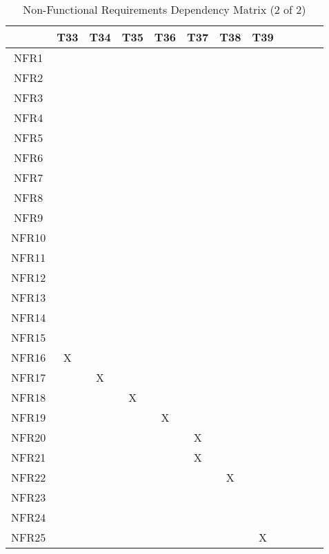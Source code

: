\documentclass[12pt, titlepage]{article}
\begin{document}
\pagebreak
\begin{table}[H]
  \centering
  \caption{Non-Functional Requirements Dependency Matrix (2 of 2)}
  \begin{tabular}{|c|c|c|c|c|c|c|c|c|c|c|c|}
  \hline
    & T33 & T34 & T35 & T36 & T37 & T38 & T39\\
  \hline
  NFR1      & & & & & & & \\ 
  \hline
  NFR2      & & & & & & &  \\ 
  \hline
  NFR3      & & & & & & &  \\ 
  \hline
  NFR4      & & & & & & &  \\ 
  \hline
  NFR5      & & & & & & & \\ 
  \hline
  NFR6      & & & & & & &  \\ 
  \hline
  NFR7      & & & & & & &  \\ 
  \hline
  NFR8      & & & & & & &  \\ 
  \hline
  NFR9      & & & & & & &  \\ 
  \hline
  NFR10     & & & & & & &  \\ 
  \hline
  NFR11     & & & & & & &  \\ 
  \hline
  NFR12     & & & & & & &  \\ 
  \hline
  NFR13     & & & & & & &  \\ 
  \hline
  NFR14     & & & & & & &  \\ 
  \hline
  NFR15     & & & & & & &  \\  
  \hline
  NFR16     &X & & & & & & \\ 
  \hline
  NFR17     & &X & & & & & \\ 
  \hline
  NFR18     & & &X & & & &  \\ 
  \hline
  NFR19     & & & &X & & &  \\ 
  \hline
  NFR20     & & & & &X & & \\ 
  \hline
  NFR21     & & & & &X & & \\ 
  \hline
  NFR22     & & & & & &X &  \\ 
  \hline
  NFR23     & & & & & & & \\ 
  \hline
  NFR24     & & & & & & &  \\ 
  \hline
  NFR25     & & & & & & &X  \\ 
  \hline
  \end{tabular}
  
\end{table}

\end{document}
